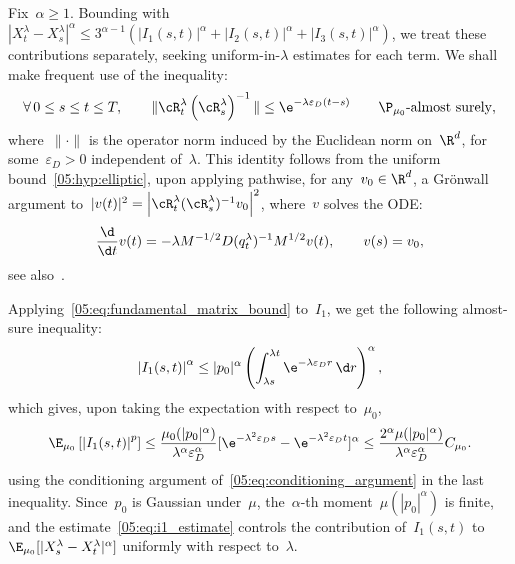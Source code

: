 Fix~$\alpha\geq 1$. Bounding with~$|X_t^\lambda-X_s^\lambda|^\alpha\leq 3^{\alpha-1}(|I_1(s,t)|^\alpha + |I_2(s,t)|^\alpha + |I_3(s,t)|^\alpha)$, we treat these contributions separately, seeking uniform-in-$\lambda$ estimates for each term.
We shall make frequent use of the inequality:
\begin{equation}
    \label{05:eq:fundamental_matrix_bound}
    \forall\,0\leq s\leq t\leq T,\qquad \|\cR_t^\lambda\left(\cR_{s}^\lambda\right)^{-1}\|\leq \e^{-\lambda\varepsilon_D(t-s)}\qquad \P_{\mu_0}\text{-almost surely},
\end{equation}
where~$\|\cdot\|$ is the operator norm induced by the Euclidean norm on~$\R^d$, for some~$\varepsilon_D>0$ independent of~$\lambda$.
This identity follows from the uniform bound~\eqref{05:hyp:elliptic}, upon applying pathwise, for any~$v_0\in\R^d$, a Gr\"onwall argument to~$|v(t)|^2 = \left|\cR_t^\lambda (\cR_s^\lambda)^{-1}v_0\right|^2$, where~$v$ solves the ODE:
\begin{equation}
\frac{\d}{\d t}v(t) = -\lambda M^{-1/2} D (q_t^\lambda)^{-1}M^{1/2}v(t),\qquad v(s) = v_0,
\end{equation}
 see also~\cite[Problem 3.31]{T00}.

Applying~\eqref{05:eq:fundamental_matrix_bound} to~$I_1$, we get the following almost-sure inequality:
\begin{equation}
    \left|I_1(s,t)\right|^\alpha \leq |p_0|^\alpha\left(\int_{\lambda s}^{\lambda t} \e^{-\lambda\varepsilon_D r}\,\d r\right)^\alpha,
\end{equation}
which gives, upon taking the expectation with respect to~$\mu_0$,
\begin{equation}
    \label{05:eq:i1_estimate}
    \E_{\mu_0}\left[\left|I_1(s,t)\right|^p\right] \leq \frac{\mu_0(|p_0|^\alpha)}{\lambda^\alpha \varepsilon_D^\alpha}[\e^{-\lambda^2\varepsilon_D s}-\e^{-\lambda^2\varepsilon_D t}]^\alpha \leq \frac{2^\alpha\mu(|p_0|^\alpha)}{\lambda^\alpha \varepsilon_D^\alpha}C_{\mu_0}.
\end{equation}
using the conditioning argument of~\eqref{05:eq:conditioning_argument} in the last inequality. Since~$p_0$ is Gaussian under~$\mu$, the~$\alpha$-th moment~$\mu(|p_0|^\alpha)$ is finite, and the estimate~\eqref{05:eq:i1_estimate} controls the contribution of~$I_1(s,t)$ to~$\E_{\mu_0}[|X_s^\lambda-X_t^\lambda|^\alpha]$ uniformly with respect to~$\lambda$.

